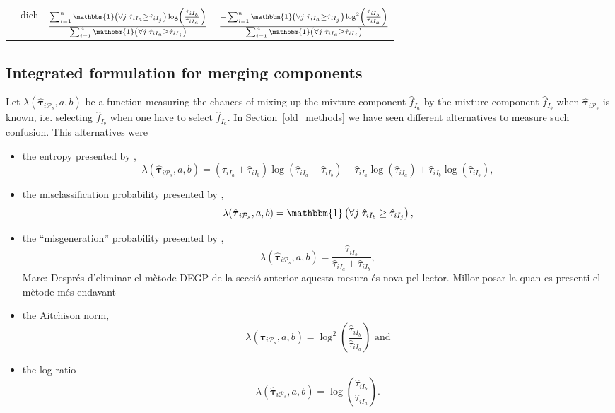 \documentclass[10pt, a4paper]{article}
\newcommand{\m}[1]{\boldsymbol{#1}}
\begin{document}
\begin{spacing}{1.9}
\begin{table}[htpb]
\begin{tabular}{c  c  c c }
& dich & $\frac{ \sum_{i=1}^n  \mathbbm{1}\left( \forall j\; \hat{\tau}_{i I_{a}} \geq \hat{\tau}_{iI_j} \right) \log \left(\frac{ \hat{\tau}_{iI_b} }{ \hat{\tau}_{iI_a} }\right)}{\sum_{i=1}^n \mathbbm{1}\left( \forall j\; \hat{\tau}_{i I_{a}} \geq \hat{\tau}_{iI_j} \right)}$ & $\frac{- \sum_{i=1}^n \mathbbm{1}\left( \forall j\; \hat{\tau}_{i I_{a}} \geq \hat{\tau}_{iI_j} \right) \log^2 \left(\frac{ \hat{\tau}_{iI_b} }{ \hat{\tau}_{iI_a} }\right)}{\sum_{i=1}^n \mathbbm{1}\left( \forall j\; \hat{\tau}_{i I_{a}} \geq \hat{\tau}_{iI_j} \right)} $\\ 


\end{tabular}
\label{table_logratio}
\end{table}





\subsection{Integrated formulation for merging components}
\label{confusion}

Let $\lambda(\hat{\m \tau}_{i \mathcal{P}_s}, a, b)$ be a function measuring the chances of mixing up the mixture component $\hat{f}_{I_a}$ by the mixture component $\hat{f}_{I_b}$ when $\hat{\m \tau}_{i \mathcal{P}_s}$ is known, i.e. selecting $\hat{f}_{I_b}$ when one have to select $\hat{f}_{I_a}$. In Section~\ref{old_methods} we have seen different alternatives to measure such confusion. This alternatives were

\begin{itemize}
\item the entropy presented by \cite{baudry2010combining},
\[\lambda(\hat{\m \tau}_{i \mathcal{P}_s}, a, b) = (\hat{\tau}_{iI_a}+\hat{\tau}_{iI_b}) \log(\hat{\tau}_{iI_a} + \hat{\tau}_{iI_b}) - \hat{\tau}_{iI_a} \log(\hat{\tau}_{iI_a}) + \hat{\tau}_{iI_b} \log(\hat{\tau}_{iI_b}),\]
\item the misclassification probability presented by \cite{hennig2010methods}, \[\lambda(\hat{\m \tau}_{i \mathcal{P}_s}, a, b) = \mathbbm{1}\left( \forall j\; \hat{\tau}_{i I_{b}} \geq \hat{\tau}_{iI_j} \right),\]
\item the ``misgeneration'' probability presented by \cite{longford2014}, \[\lambda(\hat{\m \tau}_{i \mathcal{P}_s}, a, b) = \frac{\hat{\tau}_{iI_b}}{\hat{\tau}_{iI_a} + \hat{\tau}_{iI_b}},\]{\color{blue} Marc: Després d'eliminar el mètode DEGP de la secció anterior aquesta mesura és nova pel lector. Millor posar-la quan es presenti el mètode més endavant}
\item the Aitchison norm, \[\lambda(\hat{\m \tau}_{i \mathcal{P}_s}, a, b) = \log^2 (\frac{ \hat{\tau}_{iI_b} }{ \hat{\tau}_{iI_a} }) \text{ and}\]
\item the log-ratio \[ \lambda(\hat{\m \tau}_{i \mathcal{P}_s}, a, b) = \log (\frac{ \hat{\tau}_{iI_b} }{ \hat{\tau}_{iI_a} }).\]
\end{itemize}


\end{spacing}
\end{document}
